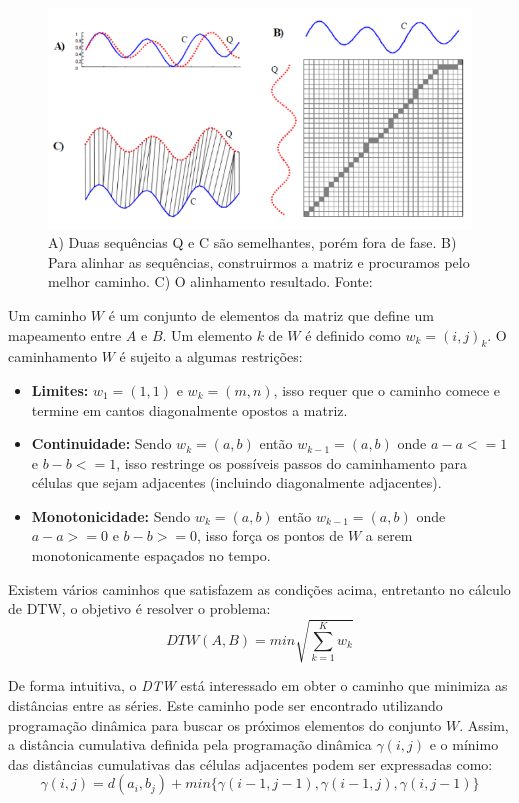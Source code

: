 \begin{figure}[H]
	\centering
	\includegraphics[scale=0.5]{pasta1_figuras/fig-dtw.png}
	\caption {A) Duas sequências Q e C são semelhantes, porém fora de fase. B) Para alinhar as sequências, construirmos a matriz e procuramos pelo melhor caminho. C) O alinhamento resultado. Fonte: \cite{Keogh2005}}
	\label{fig-dtw}
\end{figure}

Um caminho $W$ é um conjunto de elementos da matriz que define um mapeamento entre $A$ e $B$. Um elemento $k$ de $W$ é definido como $w_k = (i,j)_k$. O caminhamento $W$ é sujeito a algumas restrições:

\begin{itemize}
	\item \textbf{Limites:} $w_1 = (1,1)$ e $w_k = (m,n)$, isso requer que o caminho comece e termine em cantos diagonalmente opostos a matriz.
	\item \textbf{Continuidade:} Sendo $w_k = (a,b)$ então $w_{k-1} = (a,b)$ onde $a-a <=1$ e $b-b <= 1$, isso restringe os possíveis passos do caminhamento para células que sejam adjacentes (incluindo diagonalmente adjacentes).
	\item \textbf{Monotonicidade:} Sendo $w_k = (a,b)$ então $w_{k-1} = (a,b)$ onde $a-a >=0$ e $b-b >=0$, isso força os pontos de $W$ a serem monotonicamente espaçados no tempo. 
\end{itemize}

Existem vários caminhos que satisfazem as condições acima, entretanto no cálculo de DTW, o objetivo é resolver o problema:
\begin{equation}
DTW(A,B) = min \sqrt{\sum_{k=1}^{K} w_k}
\end{equation}


De forma intuitiva, o \textit{DTW} está interessado em obter o caminho que minimiza as distâncias entre as séries. Este caminho pode ser encontrado utilizando programação dinâmica para buscar os próximos elementos do conjunto $W$. Assim, a distância cumulativa definida pela programação dinâmica $\gamma(i,j)$ e o mínimo das distâncias cumulativas das células adjacentes podem ser expressadas como:
\begin{equation}
\gamma(i,j) = d(a_i,b_j) + min\{ \gamma(i-1,j-1),\gamma(i-1,j),\gamma(i,j-1) \}
\end{equation}

